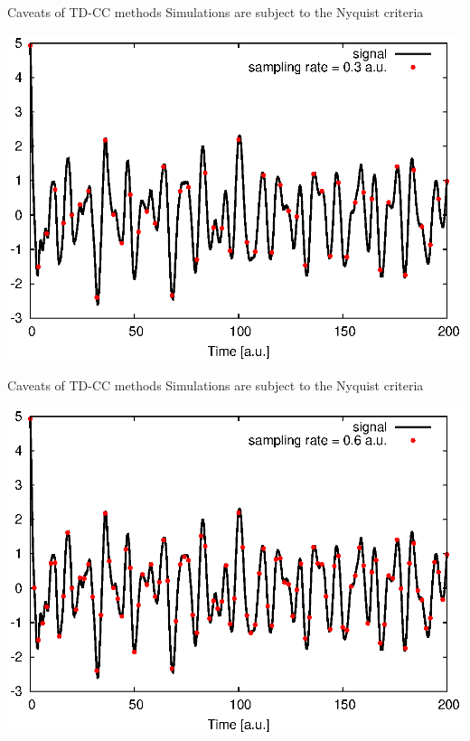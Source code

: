 \documentclass{beamer}
\begin{document}
\begin{frame}{Caveats of TD-CC methods}
Simulations are subject to the Nyquist criteria
\begin{center}
  \includegraphics[scale=0.8]{figures/nyquist2.eps}
\end{center}
\end{frame}

\begin{frame}{Caveats of TD-CC methods}
Simulations are subject to the Nyquist criteria
\begin{center}
  \includegraphics[scale=0.8]{figures/nyquist3.eps}
\end{center}
\end{frame}
\end{document}
